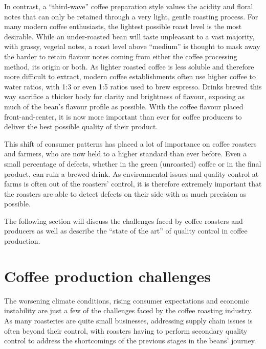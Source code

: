 In contrast, a ``third-wave'' coffee preparation style values the acidity and floral notes that can only be retained
through a very light, gentle roasting process.
For many modern coffee enthusiasts, the lightest possible roast level is the most desirable.
While an under-roasted bean will taste unpleasant to a vast majority, with grassy, vegetal notes,
a roast level above ``medium'' is thought to mask away the harder to retain flavour notes
coming from either the coffee processing method, its origin or both.
As lighter roasted coffee is less soluble and therefore more difficult to extract,
modern coffee establishments often use higher coffee to water ratios, with 1:3 or even 1:5 ratios used to brew espresso.
Drinks brewed this way sacrifice a thicker body for clarity and brightness of flavour, exposing as much of the bean's
flavour profile as possible.
With the coffee flavour placed front-and-center, it is now more important than ever for coffee producers to deliver
the best possible quality of their product.

This shift of consumer patterns has placed a lot of importance on coffee roasters and farmers,
who are now held to a higher standard than ever before.
Even a small percentage of defects, whether in the green (unroasted) coffee or in the final product,
can ruin a brewed drink.
As environmental issues and quality control at farms is often out of the roasters' control,
it is therefore extremely important that the roasters are able to detect defects on their side
with as much precision as possible.


The following section will discuss the challenges faced by coffee roasters and producers
as well as describe the ``state of the art'' of quality control in coffee production.

\section{Coffee production challenges}\label{sec:coffee-production-challenges}
The worsening climate conditions, rising consumer expectations and economic instability are just a few of the challenges
faced by the coffee roasting industry.
As many roasteries are quite small businesses, addressing supply chain issues is often beyond their control,
with roasters having to perform secondary quality control to address the shortcomings of the previous stages in the beans'
journey.

